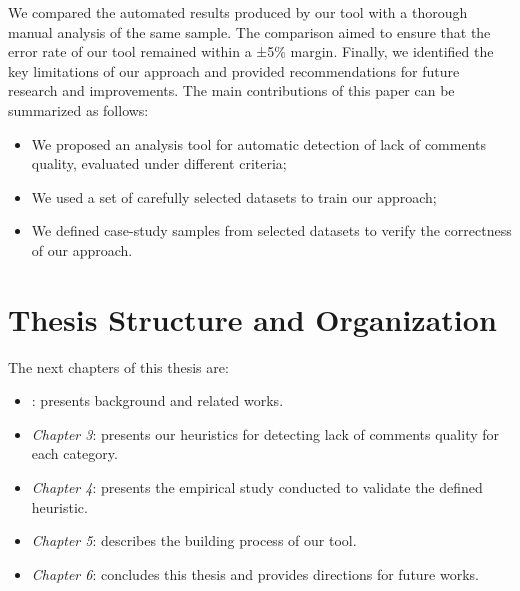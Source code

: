 \noindent We compared the automated results produced by our tool with a thorough manual analysis of the same sample. The comparison aimed to ensure that the error rate of our tool remained within a ±5\% margin. Finally, we identified the key limitations of our approach and provided recommendations for future research and improvements. The main contributions of this paper can be summarized as follows:
\begin{itemize}
    \item We proposed an analysis tool for automatic detection of lack of comments quality, evaluated under different criteria;
    \item We used a set of carefully selected datasets to train our approach;
    \item We defined case-study samples from selected datasets to verify the correctness of our approach.
\end{itemize}

\section{Thesis Structure and Organization}
The next chapters of this thesis are:

\begin{itemize}
\item {}: presents background and related works.
\item \textit{Chapter 3}: presents our heuristics for detecting lack of comments quality for each category.
\item \textit{Chapter 4}: presents the empirical study conducted to validate the
defined heuristic.
\item \textit{Chapter 5}: describes the building process of our tool.
\item \textit{Chapter 6}: concludes this thesis and provides directions for future
works.

\end{itemize}